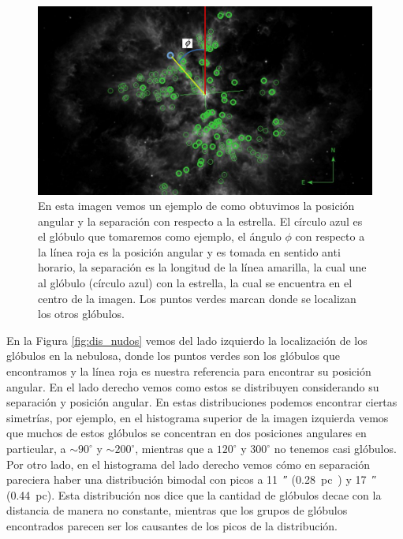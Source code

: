 \documentclass{book}
\begin{document}
\begin{figure}[htb]
    \centering
    \includegraphics[width=\textwidth]{ultimas correcciones/M167_PA.pdf}
    \caption{En esta imagen vemos un ejemplo de como obtuvimos la
      posición angular y la separación con respecto a la estrella. El
      círculo azul es el glóbulo que tomaremos como ejemplo, el ángulo
      $\phi$ con respecto a la línea roja es la posición angular y es
      tomada en sentido anti horario, la separación es la longitud de
      la línea amarilla, la cual une al glóbulo (círculo azul) con la
      estrella, la cual se encuentra en el centro de la imagen. Los
      puntos verdes marcan donde se localizan los otros glóbulos.}
    \label{fig:ejemplo_PA_Sep}
\end{figure}

En la Figura \ref{fig:dis_nudos} vemos del lado izquierdo la
localización de los glóbulos en la nebulosa, donde los puntos verdes
son los glóbulos que encontramos y la línea roja es nuestra referencia
para encontrar su posición angular. En el lado derecho vemos como
estos se distribuyen considerando su separación y posición angular. En
estas distribuciones podemos encontrar ciertas simetrías, por ejemplo,
en el histograma superior de la imagen izquierda vemos que muchos de
estos glóbulos se concentran en dos posiciones angulares en
particular, a $\sim90^\circ$ y $\sim200^\circ$, mientras que a
$120^\circ$ y $300^\circ$ no tenemos casi glóbulos. Por otro lado, en el
histograma del lado derecho vemos cómo en separación pareciera haber
una distribución bimodal con picos a \SI{11}{\arcsecond}
(\SI{.28}{pc)} y \SI{17}{\arcsecond} (\SI{.44}{pc}). Esta distribución
nos dice que la cantidad de glóbulos decae con la distancia de manera
no constante, mientras que los grupos de glóbulos encontrados parecen
ser los causantes de los picos de la distribución.
\end{document}
